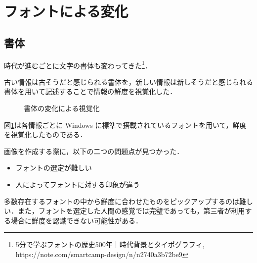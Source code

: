\section{フォントによる変化}
\label{sec:ver-font}

\subsection{書体}
\label{subsec:ver-fnt-stl}

時代が進むごとに文字の書体も変わってきた\footnote{5分で学ぶフォントの歴史500年｜時代背景とタイポグラフィ, https://note.com/smartcamp-design/n/n2740a3b72be9}．

古い情報は古そうだと感じられる書体を，新しい情報は新しそうだと感じられる書体を用いて記述することで情報の鮮度を視覚化した．

\begin{figure}[htbp]
  \begin{center}
  \end{center}
  \caption{書体の変化による視覚化}
  \label{fig:ver-style}
\end{figure}

図\ref{fig:ver-style}は各情報ごとに Windows に標準で搭載されているフォントを用いて，鮮度を視覚化したものである．

画像を作成する際に，以下の二つの問題点が見つかった．

\begin{itemize}
  \item フォントの選定が難しい
  \item 人によってフォントに対する印象が違う
\end{itemize}

多数存在するフォントの中から鮮度に合わせたものをピックアップするのは難しい．また，フォントを選定した人間の感覚では完璧であっても，第三者が利用する場合に鮮度を認識できない可能性がある．

